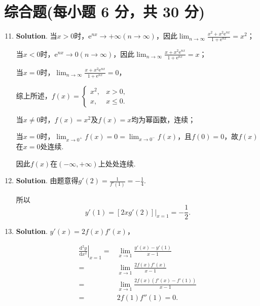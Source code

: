 \documentclass[../Main.tex]{subfiles}
\begin{document}
\section{综合题(每小题 6 分，共 30 分)}
\begin{enumerate}
    \setcounter{enumi}{10}
    \item \textbf{Solution}. 当$x>0$时，$\mathrm{e}^{nx}\to+\infty(n\to\infty
              )$，因此$\lim_{n\to\infty}\frac{x^{2}+x^{2}\mathrm{e}^{nx}}{1+\mathrm{e}^{nx}}
              =x^{2}$；

          当$x<0$时，$\mathrm{e}^{nx}\to0(n\to\infty)$，因此$\lim_{n\to\infty}\frac{x+x^{2}\mathrm{e}^{nx}}{1+\mathrm{e}^{nx}}
              =x$；

          当$x=0$时，$\lim_{n\to\infty}\frac{x+x^{2}\mathrm{e}^{nx}}{1+\mathrm{e}^{nx}}
              =0$，

          综上所述，$f(x)=
              \begin{cases}
                  x^{2}, & x>0,    \\
                  x,     & x\leq0.
              \end{cases}$

          当$x\neq0$时，$f(x)=x^{2}$及$f(x)=x$均为幂函数，连续；

          当$x=0$时，$\lim_{x\to0^+}f(x)=0=\lim_{x\to0^-}f(x)$，且$f(0)=0$，故$f(x)$在$x
              =0$处连续.

          因此$f(x)$在$(-\infty,+\infty)$上处处连续.

    \item \textbf{Solution}. 由题意得$g'(2)=\frac{1}{f'(1)}=-\frac{1}{4}$.

          所以
          \[
              y'(1)=\left.[2xg'(2)]\right|_{x=1}=-\frac{1}{2}.
          \]

    \item \textbf{Solution}. $y'(x)=2f(x)f'(x)$，

          \[
              \begin{aligned}
                  \left.\frac{\mathrm{d}^2 y}{\mathrm{d}x^2}\right|_{x=1}= & \lim_{x\to1}\frac{y'(x)-y'(1)}{x-1}        \\
                  =                                                        & \lim_{x\to1}\frac{2f(x)f'(x)}{x-1}         \\
                  =                                                        & \lim_{x\to1}\frac{2f(x)(f'(x)-f'(1))}{x-1} \\
                  =                                                        & 2f(1)f''(1)=0.
              \end{aligned}
          \]


\end{enumerate}
\end{document}
